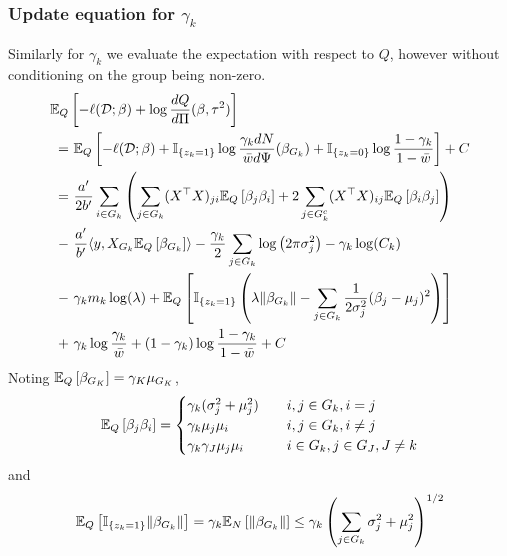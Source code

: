 \subsubsection{Update equation for $\gamma_k$}

Similarly for $\gamma_k$ we evaluate the expectation with respect to $Q$, however without conditioning on the group being non-zero.
{\allowdisplaybreaks
\begin{align}
    \mathbb{E}_{Q} & \left[ 
	- \ell(\mathcal{D}; \beta) + \log \frac{dQ}{d\Pi}(\beta, \tau^2) 
    \right]  \nonumber \\
= &\
    \mathbb{E}_{Q} \left[ 
	- \ell(\mathcal{D}; \beta) 
	+ \mathbb{I}_{\{z_k = 1\}} \log \frac{\gamma_k dN}{\bar{w} d\Psi}(\beta_{G_k}) 
	+ \mathbb{I}_{\{z_k = 0\}} \log \frac{1 - \gamma_k}{1 - \bar{w}}
    \right] + C \nonumber \\
=&\
    \frac{a'}{2b'} 
    \sum_{i \in G_k} \left( 
	\sum_{j \in G_k} (X^\top X)_{ji} 
	    \mathbb{E}_{Q} \left[ \beta_j \beta_i \right] 
	+ 
	2 \sum_{j \in G_k^c} (X^\top X)_{ij} 
	    \mathbb{E}_{Q} \left[ \beta_i \beta_j \right] 
    \right ) \nonumber \\
- &\
    \frac{a'}{b'} \langle y, X_{G_k} \mathbb{E}_Q\left[\beta_{G_k} \right] \rangle 
-
    \frac{\gamma_k}{2} \sum_{j \in G_k} \log \left( 2 \pi \sigma_j^2 \right)
-
    \gamma_k \log(C_k )
    \nonumber \\
- &\
    \gamma_k m_k \log (\lambda) 
+ 
    \mathbb{E}_{Q} \left[ 
	\mathbb{I}_{\{z_k=1\}} \left(
	\lambda \| \beta_{G_k} \|
	- \sum_{j \in G_k}
	    \frac{1}{2\sigma_j^2} (\beta_{j} - \mu_j)^2
	\right)
    \right]  \nonumber \\ 
+ &\
    \gamma_k \log \frac{\gamma_k}{\bar{w}}
    + (1 - \gamma_k) \log \frac{1 - \gamma_k}{1 - \bar{w}}
+ C \nonumber
\end{align}
}
Noting $\mathbb{E}_Q \left[ \beta_{G_K} \right] = \gamma_K \mu_{G_K} $,
\begin{equation}
    \mathbb{E}_{Q} \left[ \beta_j \beta_i \right] = \begin{cases}
	\gamma_k (\sigma_{j}^2 + \mu_{j}^2) 	& \quad i,j \in G_k, i=j \\
	\gamma_k \mu_{j}\mu_{i} 		& \quad i,j \in G_k, i \neq j \\
	\gamma_k \gamma_J \mu_{j}\mu_{i} 	& \quad i \in G_k, j \in G_J, J \neq k
    \end{cases}
\end{equation}
and
\begin{equation}
    \mathbb{E}_Q \left[ \mathbb{I}_{\{z_k = 1\}} \| \beta_{G_k} \| \right] = 
    \gamma_k \mathbb{E}_{N} \left[ \| \beta_{G_k} \| \right]
    \leq \gamma_k \left( \sum_{j \in G_k} \sigma^2_j + \mu^2_j \right)^{1/2}
\end{equation}
